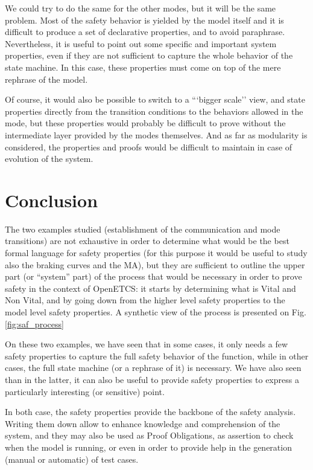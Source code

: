 \documentclass{template/openetcs_article}
\begin{document}
We could try to do the same for the other modes, but it will be the same problem. Most of the safety 
behavior is yielded by the model itself and it is difficult to produce a set of
declarative properties, and to avoid paraphrase. Nevertheless, it is useful to point out some specific 
and important system properties, even if they are not sufficient to capture the whole behavior of 
the state machine. In this case, these properties must come on top of the mere rephrase of the model.

Of course, it would also be possible to switch to a ```bigger scale'' view, and state properties
directly from the transition conditions to the behaviors allowed in the mode, but these properties 
would probably be difficult to prove without the intermediate layer provided by the modes themselves.
And as far as modularity is considered, the properties and proofs would be difficult to maintain in 
case of evolution of the system.


\section{Conclusion}
The two examples studied (establishment of the communication and mode transitions) are not exhaustive
in order to determine what would be the best formal language for safety properties (for this purpose
it would be useful to study also the braking curves and the MA), but they are sufficient to outline 
the upper part (or ``system'' part) of the process that would be necessary in order to prove safety 
in the context of OpenETCS: it starts by determining what is Vital and Non Vital, and by going down 
from the higher level safety properties to the model level safety properties. A synthetic view of the
process is presented on Fig. \ref{fig:saf_process}

On these two examples, we have seen that in some cases, it only needs a few safety properties to capture
the full safety behavior of the function, while in other cases, the full state machine (or a rephrase of 
it) is necessary. We have also seen than in the latter, it can also be useful to provide safety 
properties to express a particularly interesting (or sensitive) point.

In both case, the safety properties provide the backbone of the safety analysis. Writing them down 
allow to enhance knowledge and comprehension of the system, and they may also be used as Proof 
Obligations, as assertion to check when the model is running, or even in order to provide help in the
generation (manual or automatic) of test cases. 
\end{document}
